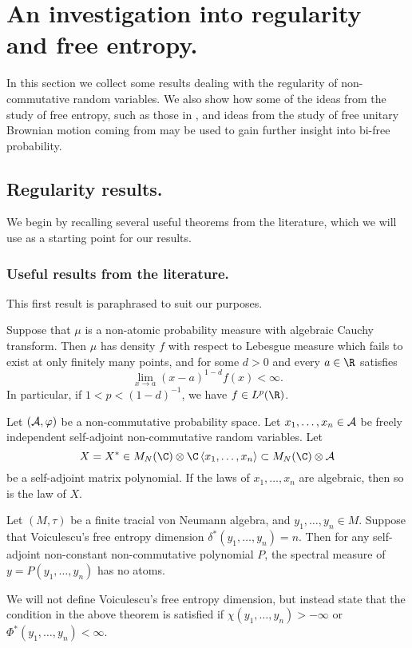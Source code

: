 \chapter{An investigation into regularity and free entropy.}
In this section we collect some results dealing with the regularity of non-commutative random variables.
We also show how some of the ideas from the study of free entropy, such as those in \cite{Voiculescu1999101}, and ideas from the study of free unitary Brownian motion coming from \cite{biane1997free} may be used to gain further insight into bi-free probability.

\section{Regularity results.}
We begin by recalling several useful theorems from the literature, which we will use as a starting point for our results.

\subsection{Useful results from the literature.}
This first result is paraphrased to suit our purposes.
\begin{theorem}
	Suppose that $\mu$ is a non-atomic probability measure with algebraic Cauchy transform.
	Then $\mu$ has density $f$ with respect to Lebesgue measure which fails to exist at only finitely many points, and for some $d > 0$ and every $a \in \R$ satisfies
	$$\lim_{x\to a}(x-a)^{1-d} f(x) < \infty.$$
	In particular, if $1 < p < (1-d)^{-1}$, we have $f \in L^p(\R)$.
	\label{thm:alginlp}
\end{theorem}

\begin{theorem}
	\label{thm:algebraicandfree}
	Let $(\mathcal{A}, \varphi)$ be a non-commutative probability space.
	Let $x_1, \ldots, x_n \in \mathcal{A}$ be freely independent self-adjoint non-commutative random variables.
	Let $$X = X^* \in M_N(\C)\otimes\C\ang{x_1, \ldots, x_n} \subset M_N(\C)\otimes\A$$ be a self-adjoint matrix polynomial.
	If the laws of $x_1, \ldots, x_n$ are algebraic, then so is the law of $X$.
\end{theorem}

\begin{theorem}
	\label{thm:noatoms}
	Let $(M, \tau)$ be a finite tracial von Neumann algebra, and $y_1, \ldots, y_n \in M$.
	Suppose that Voiculescu's free entropy dimension $\delta^*(y_1, \ldots, y_n) = n$.
	Then for any self-adjoint non-constant non-commutative polynomial $P$, the spectral measure of $y = P(y_1, \ldots, y_n)$ has no atoms.
\end{theorem}
We will not define Voiculescu's free entropy dimension, but instead state that the condition in the above theorem is satisfied if $\chi(y_1, \ldots, y_n) > -\infty$ or $\Phi^*(y_1, \ldots, y_n) < \infty$.

